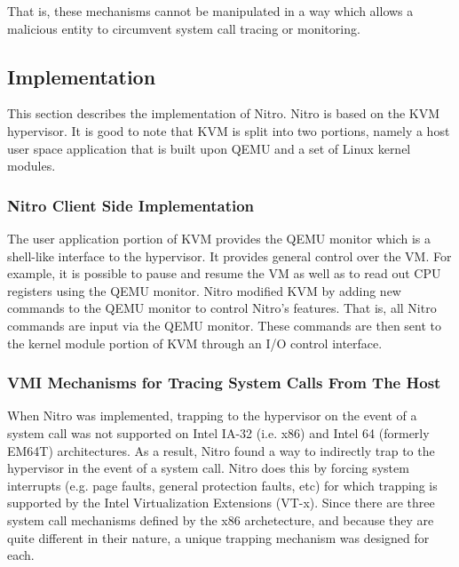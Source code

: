 \documentclass{report}
\begin{document}
\begin{spacing}{1.5}
{That is, these mechanisms cannot be manipulated in a way which allows a malicious
entity to circumvent system call tracing or monitoring.
\newline
}


\subsection{Implementation}

{\large
This section describes the implementation of Nitro. Nitro is based on the KVM hypervisor. It is good to note that KVM is split into two portions, namely a host user space application that is built upon QEMU and a set of Linux kernel modules.
\newline
}

\subsubsection{Nitro Client Side Implementation}

{\large
The user application portion of KVM provides the QEMU monitor which is a shell-like interface to the hypervisor. It provides general control over the VM. For example, it is possible to pause and resume the VM as well as to read out CPU registers using the QEMU monitor. Nitro modified KVM by adding new commands to the QEMU monitor to control Nitro’s features. That is, all Nitro commands are input via the QEMU monitor. These commands are then sent to the kernel module portion of KVM through an I/O control interface.
}


\subsubsection{VMI Mechanisms for Tracing System Calls From The Host}

{\large
When Nitro was implemented, trapping to the hypervisor on the event of a system call was not supported on Intel IA-32 (i.e. x86) and Intel 64 (formerly EM64T) architectures. As a result, Nitro found a way to indirectly trap to the hypervisor in the event of a system call. Nitro does this by forcing system interrupts (e.g. page faults, general protection faults, etc) for which trapping is supported by the Intel Virtualization Extensions (VT-x). Since there are three system call mechanisms defined by the x86 archetecture, and because they are quite different in their nature, a unique trapping mechanism was designed for each.
\newline
}



\end{spacing}
\end{document}
